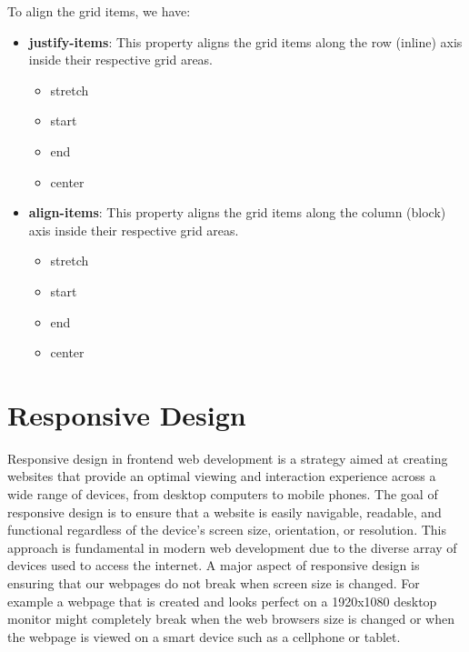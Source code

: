 \documentclass{report}
\begin{document}
    \bigbreak \noindent 
    To align the grid items, we have:
    \begin{itemize}
        \item \textbf{justify-items}: This property aligns the grid items along the row (inline) axis inside their respective grid areas.
            \begin{itemize}
                \item stretch
                \item start
                \item end
                \item center
            \end{itemize}
        \item \textbf{align-items}: This property aligns the grid items along the column (block) axis inside their respective grid areas.
            \begin{itemize}
                \item stretch
                \item start
                \item end
                \item center
            \end{itemize}
    \end{itemize}

    \bigbreak \noindent 

    \pagebreak \bigbreak \noindent 
    \section{\LARGE Responsive Design}
    \bigbreak \noindent 
    \begin{concept}
        Responsive design in frontend web development is a strategy aimed at creating websites that provide an optimal viewing and interaction experience across a wide range of devices, from desktop computers to mobile phones. The goal of responsive design is to ensure that a website is easily navigable, readable, and functional regardless of the device's screen size, orientation, or resolution. This approach is fundamental in modern web development due to the diverse array of devices used to access the internet.
        \bigbreak \noindent 
        A major aspect of responsive design is ensuring that our webpages do not break when screen size is changed. For example a webpage that is created and looks perfect on a 1920x1080 desktop monitor might completely break when the web browsers size is changed or when the webpage is viewed on a smart device such as a cellphone or tablet.
    \end{concept}
    \bigbreak \noindent 
\end{document}

